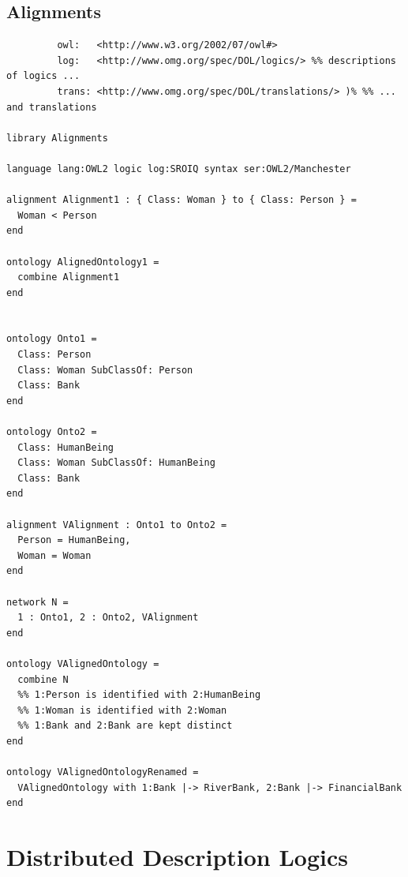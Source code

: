 \documentclass[10pt,fleqn,%
\ifpretendfinal
final%
\else
draft%
\fi,
]{scrreprt}
\newcommand{\sclause}[1]{\section{#1}}
\newcommand{\ssclause}[1]{\subsection{#1}}
\begin{document}
\ssclause{Alignments}
\begin{lstlisting}[basicstyle=\ttfamily,language=dolText,morekeywords={props,ObjectProperty,Class,DisjointUnionOf,SubClassOf,Characteristics,Transitive,Asymmetric,SubPropertyOf,DisjointClasses,EquivalentTo,inverse,only,forall,iff,if,or,exists,distributed},escapechar=@,mathescape]
%prefix( :     <http://www.example.org/alignment#>
         owl:   <http://www.w3.org/2002/07/owl#>
         log:   <http://www.omg.org/spec/DOL/logics/> %% descriptions of logics ...
         trans: <http://www.omg.org/spec/DOL/translations/> )% %% ... and translations

library Alignments

language lang:OWL2 logic log:SROIQ syntax ser:OWL2/Manchester

alignment Alignment1 : { Class: Woman } to { Class: Person } =
  Woman < Person
end

ontology AlignedOntology1 =
  combine Alignment1
end


ontology Onto1 =
  Class: Person
  Class: Woman SubClassOf: Person
  Class: Bank
end

ontology Onto2 =
  Class: HumanBeing
  Class: Woman SubClassOf: HumanBeing
  Class: Bank
end

alignment VAlignment : Onto1 to Onto2 =
  Person = HumanBeing,
  Woman = Woman
end

network N =
  1 : Onto1, 2 : Onto2, VAlignment
end
 
ontology VAlignedOntology =
  combine N
  %% 1:Person is identified with 2:HumanBeing
  %% 1:Woman is identified with 2:Woman
  %% 1:Bank and 2:Bank are kept distinct
end

ontology VAlignedOntologyRenamed =
  VAlignedOntology with 1:Bank |-> RiverBank, 2:Bank |-> FinancialBank
end

\end{lstlisting}


\sclause{Distributed Description Logics}
\end{document}
